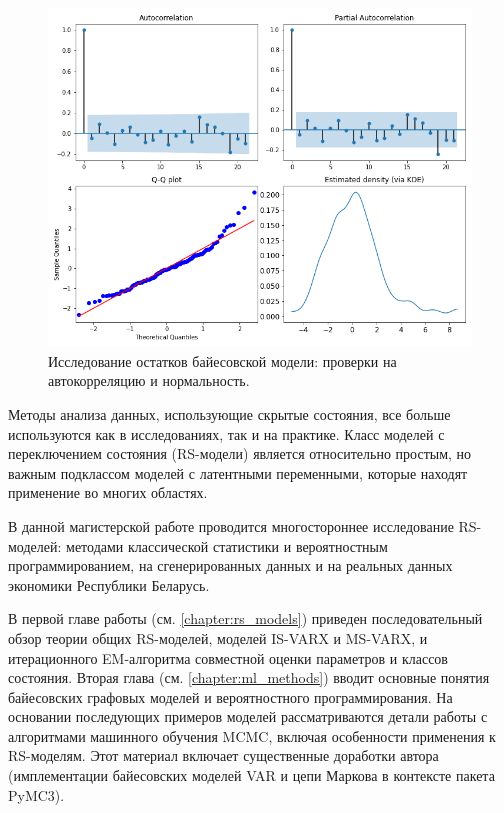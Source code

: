 \documentclass[a4paper,14pt]{extreport}
\begin{document}
\begin{figure}[H]
	\includegraphics[width=\linewidth]{img/gen/pp_ms_arx_resid.png}
	\caption{
		Исследование остатков байесовской модели: 
		проверки на автокорреляцию и нормальность.
	}
	\label{fig:pp_ms_arx_resid}
\end{figure}




Методы анализа данных, использующие скрытые состояния, все больше используются как в исследованиях, так и на практике. Класс моделей с переключением состояния (RS-модели) является относительно простым, но важным подклассом моделей с латентными переменными, которые находят применение во многих областях. 

В данной магистерской работе проводится многостороннее исследование RS-моделей: методами классической статистики и вероятностным программированием, на сгенерированных данных и на реальных данных экономики Республики Беларусь. 

В первой главе работы (см. \ref{chapter:rs_models}) приведен последовательный обзор теории общих RS-моделей, моделей IS-VARX и MS-VARX, и итерационного EM-алгоритма совместной оценки параметров и классов состояния. Вторая глава (см. \ref{chapter:ml_methods}) вводит основные понятия байесовских графовых моделей и вероятностного программирования. На основании последующих примеров моделей рассматриваются детали работы с алгоритмами машинного обучения MCMC, включая особенности применения к RS-моделям. Этот материал включает существенные доработки автора (имплементации байесовских моделей VAR и цепи Маркова в контексте пакета PyMC3).
\end{document}
